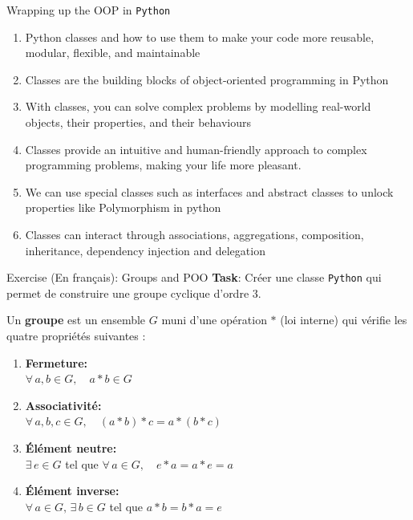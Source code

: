 \documentclass[10pt]{beamer}
\begin{document}
\begin{frame}[fragile]{Wrapping up the OOP in \texttt{Python}}


\begin{enumerate}
\item Python classes and how to use them to make your code more reusable, modular, flexible, and maintainable
\item Classes are the building blocks of object-oriented programming in Python
\item With classes, you can solve complex problems by modelling real-world objects, their properties, and their behaviours
\item Classes provide an intuitive and human-friendly approach to complex programming problems, making your life more pleasant.
\item We can use special classes such as interfaces and abstract classes to unlock properties like Polymorphism in python
\item Classes can interact through associations, aggregations, composition, inheritance, dependency injection and delegation 
\end{enumerate}

\end{frame}

\begin{frame}{Exercise (En français): Groups and POO}
	\textbf{Task}: Créer une classe \texttt{Python} qui permet de construire une groupe cyclique d'ordre $3$.
	
	Un \textbf{groupe} est un ensemble $G$ muni d'une opération $\ast$ (loi interne) qui vérifie les quatre propriétés suivantes :
	\begin{enumerate}
		\item \textbf{Fermeture:} \\
		$\forall\, a, b \in G,\quad a \ast b \in G$
		\item \textbf{Associativité:} \\
		$\forall\, a, b, c \in G,\quad (a \ast b) \ast c = a \ast (b \ast c)$
		\item \textbf{Élément neutre:} \\
		$\exists\, e \in G$ tel que $\forall\, a \in G,\quad e \ast a = a \ast e = a$
		\item \textbf{Élément inverse:} \\
		$\forall\, a \in G,\, \exists\, b \in G$ tel que $a \ast b = b \ast a = e$
	\end{enumerate}
\end{frame}
\end{document}

